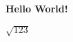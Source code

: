\documentclass[a4paper,12pt]{article}
\begin{document}
\maketitle
\begin{flushright}
\textbf{Hello World!}
\end{flushright}
$\sqrt{123}$
\end{document}
